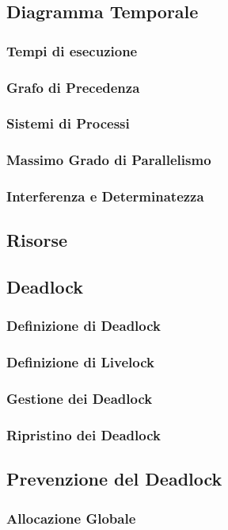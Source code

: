 \documentclass[a4paper]{article}
\begin{document}
\subsection{Diagramma Temporale}
\subsubsection*{Tempi di esecuzione}
\subsubsection*{Grafo di Precedenza}
\subsubsection*{Sistemi di Processi}
\subsubsection*{Massimo Grado di Parallelismo}
\subsubsection*{Interferenza e Determinatezza}
\subsection{Risorse}
\subsection{Deadlock}
\subsubsection*{Definizione di Deadlock}
\subsubsection*{Definizione di Livelock}
\subsubsection*{Gestione dei Deadlock}
\subsubsection*{Ripristino dei Deadlock}
\subsection{Prevenzione del Deadlock}
\subsubsection*{Allocazione Globale}
\end{document}
